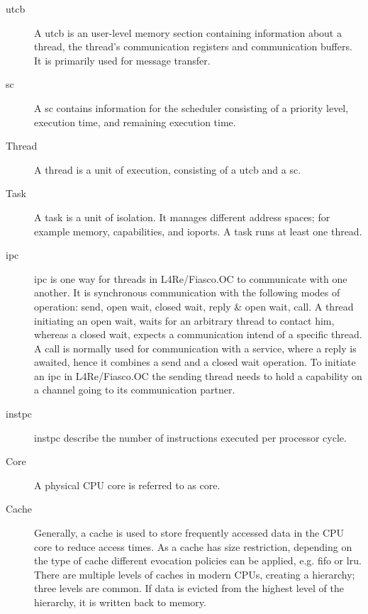 \begin{description}
  \item[\Gls{utcb}] A \gls{utcb} is an user-level memory section containing
    information about a thread, the thread's communication registers and
    communication buffers. It is primarily used for message transfer.

  \item[\Gls{sc}] A \gls{sc} contains information for the scheduler consisting
    of a priority level, execution time, and remaining execution time.

  \item[Thread] A thread is a unit of execution, consisting of a \gls{utcb}
    and a \gls{sc}.

  \item[Task] A task is a unit of isolation. It manages different address
    spaces; for example memory, capabilities, and ioports.
    A task runs at least one thread.

  \item[\Gls{ipc}] \Gls{ipc} is one way for threads in L4Re/Fiasco.OC
    to communicate with one another.
    It is synchronous communication with the following modes of operation:
    send, open wait, closed wait, reply \& open wait, call.
    A thread initiating an open wait, waits for an arbitrary thread to contact
    him, whereas a closed wait, expects a communication intend of a specific
    thread.
    A call is normally used for communication with a service, where a reply is
    awaited, hence it combines a send and a closed wait operation.
    To initiate an \gls{ipc} in L4Re/Fiasco.OC the sending thread needs to hold
    a capability on a channel going to its communication partner.

  \item[\Gls{instpc}] \Gls{instpc} describe the number of instructions executed
    per processor cycle.


  \item[Core] A physical CPU core is referred to as core.

  \item[Cache] Generally, a cache is used to store frequently accessed data
    in the CPU core to reduce access times.
    As a cache has size restriction, depending on the type of cache different
    evocation policies can be applied, e.g. \gls{fifo} or \gls{lru}.
    There are multiple levels of caches in modern CPUs, creating a hierarchy;
    three levels are common.
    If data is evicted from the highest level of the hierarchy, it is written
    back to memory.


\end{description}

